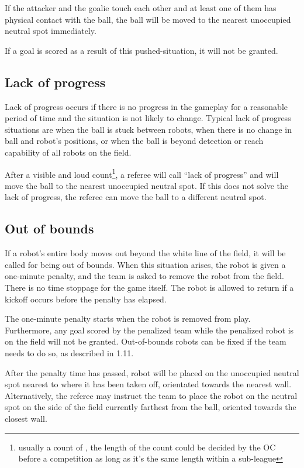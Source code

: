 \documentclass{article}
\begin{document}
If the attacker and the goalie touch each other and at least one of them has
physical contact with the ball, the ball will be moved to the nearest
unoccupied neutral spot immediately.

If a goal is scored as a result of this pushed-situation, it will not be
granted.

\subsection{Lack of progress \label{ref-lack-of-progress}}

Lack of progress occurs if there is no progress in the gameplay for a
reasonable period of time and the situation is not likely to change. Typical
lack of progress situations are when the ball is stuck between robots, when
there is no change in ball and robot's positions, or when the ball is beyond
detection or reach capability of all robots on the field.

After a visible and loud count\footnote{usually a count of
, the length of the count could be decided by
the OC before a competition as long as it's the same length within a
sub-league}, a referee will call ``lack of progress'' and will move the ball
to the nearest unoccupied neutral spot. If this does not solve the lack of
progress, the referee can move the ball to a different neutral spot.

\subsection{Out of bounds \label{ref-011}}

If a robot's entire body moves out beyond the white line of the field, it
will be called for being out of bounds. When this situation arises, the robot
is given a one-minute penalty, and the team is asked to remove the robot from
the field. There is no time stoppage for the game itself. The robot is allowed
to return if a kickoff occurs before the penalty has elapsed.

The one-minute penalty starts when the robot is removed from play. Furthermore,
any goal scored by the penalized team while the penalized robot is on the field
will not be granted. Out-of-bounds robots can be fixed if the team needs to do
so, as described in 1.11.

After the penalty time has passed, robot will be placed on the unoccupied
neutral spot 
{nearest to where it has been taken off, orientated towards the
nearest wall.  Alternatively, the referee may instruct the team to place the
robot on the neutral spot on the side of the field currently farthest from the
ball, oriented towards the closest wall.}
\end{document}
